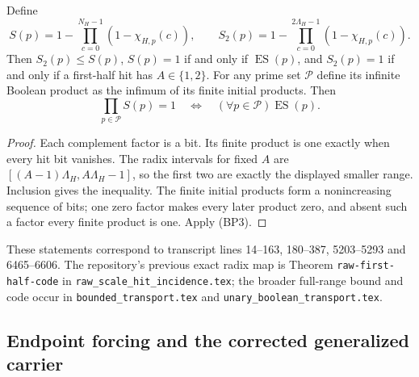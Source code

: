 \begin{corollary}
Define
\[
 S(p)=1-\prod_{c=0}^{N_H-1}(1-\chi_{H,p}(c)),\qquad
 S_2(p)=1-\prod_{c=0}^{2\Lambda_H-1}(1-\chi_{H,p}(c)).
\]
Then \(S_2(p)\le S(p)\), \(S(p)=1\) if and only if
\(\operatorname{ES}(p)\), and \(S_2(p)=1\) if and only if a
first-half hit has \(A\in\{1,2\}\). For any prime set \(\mathcal P\)
define its infinite Boolean product as the infimum of its finite
initial products. Then
\[
 \prod_{p\in\mathcal P}S(p)=1
 \quad\Longleftrightarrow\quad
 (\forall p\in\mathcal P)\operatorname{ES}(p).
\]
\end{corollary}
\begin{proof}
Each complement factor is a bit. Its finite product is one exactly
when every hit bit vanishes. The radix intervals for fixed \(A\)
are \([(A-1)\Lambda_H,A\Lambda_H-1]\), so the first two are
exactly the displayed smaller range. Inclusion gives the inequality.
The finite initial products form a nonincreasing sequence of bits;
one zero factor makes every later product zero, and absent such a
factor every finite product is one. Apply (BP3).
\end{proof}

These statements correspond to transcript lines 14--163, 180--387,
5203--5293 and 6465--6606. The repository's previous exact radix map
is Theorem \texttt{raw-first-half-code} in
\nolinkurl{raw_scale_hit_incidence.tex}; the broader full-range
bound and code occur in \nolinkurl{bounded_transport.tex} and
\nolinkurl{unary_boolean_transport.tex}.

\subsection{Endpoint forcing and the corrected generalized carrier}

